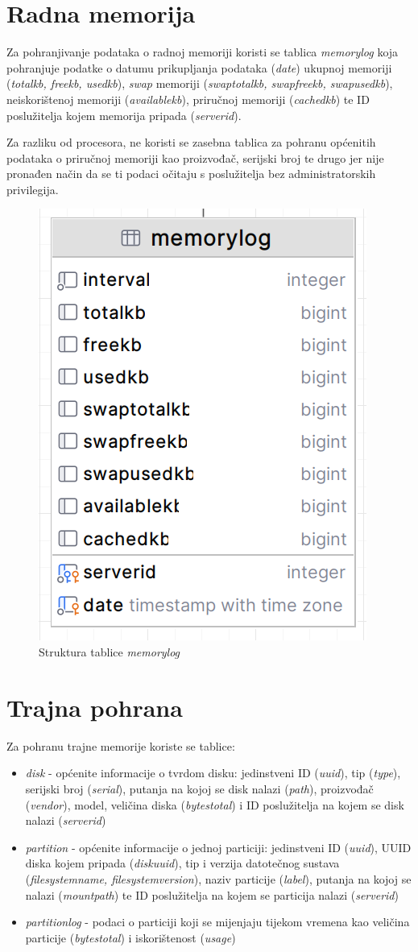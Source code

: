 \documentclass[zavrsnirad]{fer}
\begin{document}
\section{Radna memorija}
Za pohranjivanje podataka o radnoj memoriji koristi se tablica \textit{memorylog} koja pohranjuje podatke o datumu prikupljanja podataka (\textit{date}) ukupnoj memoriji (\textit{totalkb, freekb, usedkb}), \textit{swap} memoriji (\textit{swaptotalkb, swapfreekb, swapusedkb}), neiskorištenoj memoriji (\textit{availablekb}), priručnoj memoriji (\textit{cachedkb}) te ID poslužitelja kojem memorija pripada (\textit{serverid}).

Za razliku od procesora, ne koristi se zasebna tablica za pohranu općenitih podataka o priručnoj memoriji kao proizvođač, serijski broj te drugo jer nije pronađen način da se ti podaci očitaju s poslužitelja bez administratorskih privilegija.

\begin{figure}[htb!]
	\centering
	\includegraphics[width=0.3\linewidth]{images/db_memorylog.png} 
	\caption{Struktura tablice \textit{memorylog}}
\end{figure}
\FloatBarrier

\section{Trajna pohrana}
Za pohranu trajne memorije koriste se tablice:
\begin{itemize}
	\item \textit{disk} - općenite informacije o tvrdom disku: jedinstveni ID (\textit{uuid}), tip (\textit{type}), serijski broj (\textit{serial}), putanja na kojoj se disk nalazi (\textit{path}), proizvođač (\textit{vendor}), model, veličina diska (\textit{bytestotal}) i ID poslužitelja na kojem se disk nalazi (\textit{serverid})
	\item \textit{partition} - općenite informacije o jednoj particiji: jedinstveni ID (\textit{uuid}), UUID diska kojem pripada (\textit{diskuuid}), tip i verzija datotečnog sustava (\textit{filesystemname, filesystemversion}), naziv particije (\textit{label}), putanja na kojoj se nalazi (\textit{mountpath}) te ID poslužitelja na kojem se particija nalazi (\textit{serverid})
	\item \textit{partitionlog} - podaci o particiji koji se mijenjaju tijekom vremena kao veličina particije (\textit{bytestotal}) i iskorištenost (\textit{usage})
\end{itemize}
\end{document}

